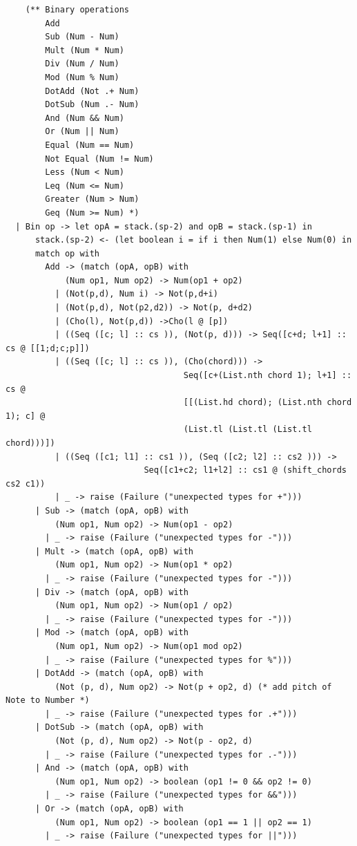 \documentclass[12pt,A4]{book}
\begin{document}
\begin{verbatim}
    (** Binary operations
        Add
        Sub (Num - Num)
        Mult (Num * Num)
        Div (Num / Num)
        Mod (Num % Num)
        DotAdd (Not .+ Num)
        DotSub (Num .- Num)
        And (Num && Num)
        Or (Num || Num)
        Equal (Num == Num)
        Not Equal (Num != Num)
        Less (Num < Num)
        Leq (Num <= Num)
        Greater (Num > Num)
        Geq (Num >= Num) *)
  | Bin op -> let opA = stack.(sp-2) and opB = stack.(sp-1) in     
      stack.(sp-2) <- (let boolean i = if i then Num(1) else Num(0) in
      match op with
        Add -> (match (opA, opB) with 
            (Num op1, Num op2) -> Num(op1 + op2)
          | (Not(p,d), Num i) -> Not(p,d+i)
          | (Not(p,d), Not(p2,d2)) -> Not(p, d+d2)
          | (Cho(l), Not(p,d)) ->Cho(l @ [p])
          | ((Seq ([c; l] :: cs )), (Not(p, d))) -> Seq([c+d; l+1] :: cs @ [[1;d;c;p]])
          | ((Seq ([c; l] :: cs )), (Cho(chord))) -> 
                                    Seq([c+(List.nth chord 1); l+1] :: cs @  
                                    [[(List.hd chord); (List.nth chord 1); c] @ 
                                    (List.tl (List.tl (List.tl chord)))])
          | ((Seq ([c1; l1] :: cs1 )), (Seq ([c2; l2] :: cs2 ))) -> 
                            Seq([c1+c2; l1+l2] :: cs1 @ (shift_chords cs2 c1))
          | _ -> raise (Failure ("unexpected types for +")))
      | Sub -> (match (opA, opB) with 
          (Num op1, Num op2) -> Num(op1 - op2)
        | _ -> raise (Failure ("unexpected types for -")))
      | Mult -> (match (opA, opB) with 
          (Num op1, Num op2) -> Num(op1 * op2)
        | _ -> raise (Failure ("unexpected types for -")))
      | Div -> (match (opA, opB) with 
          (Num op1, Num op2) -> Num(op1 / op2)
        | _ -> raise (Failure ("unexpected types for -")))
      | Mod -> (match (opA, opB) with 
          (Num op1, Num op2) -> Num(op1 mod op2)
        | _ -> raise (Failure ("unexpected types for %")))
      | DotAdd -> (match (opA, opB) with 
          (Not (p, d), Num op2) -> Not(p + op2, d) (* add pitch of Note to Number *)
        | _ -> raise (Failure ("unexpected types for .+")))
      | DotSub -> (match (opA, opB) with 
          (Not (p, d), Num op2) -> Not(p - op2, d) 
        | _ -> raise (Failure ("unexpected types for .-")))
      | And -> (match (opA, opB) with 
          (Num op1, Num op2) -> boolean (op1 != 0 && op2 != 0)
        | _ -> raise (Failure ("unexpected types for &&")))
      | Or -> (match (opA, opB) with 
          (Num op1, Num op2) -> boolean (op1 == 1 || op2 == 1)
        | _ -> raise (Failure ("unexpected types for ||")))

\end{verbatim}
\end{document}
